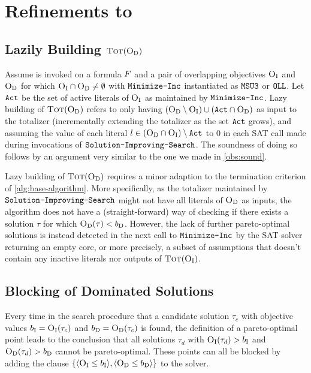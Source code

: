 \section{Refinements to \algname{}\label{sec:refinements}}

\subsection{Lazily Building $\textsc{Tot}(\textsc{O}_{\text{D}})$}

Assume \algname{} is invoked on a formula $F$ and a pair of overlapping objectives $\textsc{O}_{\text{I}}$ and $\textsc{O}_{\text{D}}$ for which $\textsc{O}_{\text{I}} \cap \textsc{O}_{\text{D}} \neq \emptyset$ with $\texttt{Minimize-\allowbreak{}Inc}$ instantiated as $\texttt{MSU3}$ or $\texttt{OLL}$. Let $\texttt{Act}$ be the set of active literals of $\textsc{O}_{\text{I}}$ as maintained by $\texttt{Minimize-\allowbreak{}Inc}$.
Lazy building of $\textsc{Tot}(\textsc{O}_{\text{D}})$ refers to only having $(\textsc{O}_{\text{D}} \setminus \textsc{O}_{\text{I}}) \cup  (\texttt{Act} \cap \textsc{O}_{\text{D}})$ as input to the totalizer (incrementally extending the totalizer as the set $\texttt{Act}$ grows), and assuming the value of each literal $l \in (\textsc{O}_{\text{D}} \cap \textsc{O}_{\text{I}}) \setminus \texttt{Act}$ to $0$ in each SAT call made during invocations of $\texttt{Solution-\allowbreak{}Improving-\allowbreak{}Search}$.
The soundness of doing so follows by an argument very similar to the one we made in \cref{obs:sound}.

Lazy building of $\textsc{Tot}(\textsc{O}_{\text{D}})$ requires a minor adaption to the termination criterion of \cref{alg:base-algorithm}.
More specifically, as the totalizer maintained by $\texttt{Solution-\allowbreak{}Improving-\allowbreak{}Search}$ might not have all literals of $\textsc{O}_{\text{D}}$ as inputs, the algorithm does not have a (straight-forward) way of checking if there exists a solution $\tau$ for which $\textsc{O}_{\text{D}}(\tau) < b_{\text{D}}$.
However, the lack of further pareto-optimal solutions is instead detected in the next call to $\texttt{Minimize-\allowbreak{}Inc}$ by the SAT solver returning an empty core, or more precisely, a subset of assumptions that doesn't contain any inactive literals nor outputs of $\textsc{Tot}(\textsc{O}_{\text{I}})$.

\subsection{Blocking of Dominated Solutions}

Every time in the search procedure that a candidate solution $\tau_c$ with objective values $b_{\text{I}} = \textsc{O}_{\text{I}}(\tau_c)$ and $b_{\text{D}} = \textsc{O}_{\text{D}}(\tau_c)$ is found, the definition of a pareto-optimal point leads to the conclusion that all solutions $\tau_d$ with $\textsc{O}_{\text{I}}(\tau_d) > b_{\text{I}}$ and $\textsc{O}_{\text{D}}(\tau_d) > b_{\text{D}}$ cannot be pareto-optimal.
These points can all be blocked by adding the clause $\{ \langle \textsc{O}_{\text{I}} \leq b_{\text{I}} \rangle, \langle \textsc{O}_{\text{D}} \leq b_{\text{D}} \rangle \}$ to the solver.

